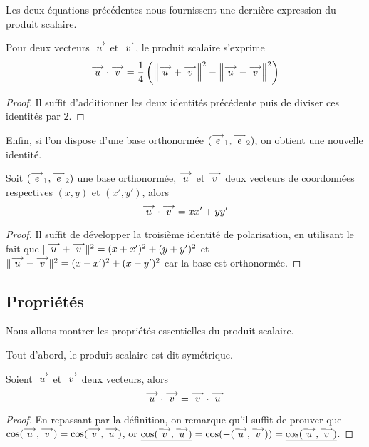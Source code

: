 Les deux équations précédentes nous fournissent une dernière expression du produit scalaire.

\begin{prop}
    Pour deux vecteurs $\overset{\longrightarrow}{u}$ et $\overset{\longrightarrow}{v}$, le produit scalaire s'exprime $$\overset{\longrightarrow}{u} \cdot \overset{\longrightarrow}{v} = \frac{1}{4}\left(\left\|\overset{\longrightarrow}{u} + \overset{\longrightarrow}{v}\right\|^2 - \left\|\overset{\longrightarrow}{u} - \overset{\longrightarrow}{v}\right\|^2 \right)
    $$
\end{prop}

\begin{proof}
    Il suffit d'additionner les deux identités précédente puis de diviser ces identités par $2$.
\end{proof}

Enfin, si l'on dispose d'une base orthonormée $(\overset{\longrightarrow}{e}_1,\overset{\longrightarrow}{e}_2)$, on obtient une nouvelle identité.

\begin{prop}
    Soit $(\overset{\longrightarrow}{e}_1,\overset{\longrightarrow}{e}_2)$ une base orthonormée, $\overset{\longrightarrow}{u}$ et $\overset{\longrightarrow}{v}$ deux vecteurs de coordonnées respectives $(x,y)$ et $(x',y')$, alors $$\overset{\longrightarrow}{u}\cdot \overset{\longrightarrow}{v}=xx'+yy'$$
\end{prop}
\begin{proof}
    Il suffit de développer la troisième identité de polarisation, en utilisant le fait que $\|\overset{\longrightarrow}{u}+\overset{\longrightarrow}{v}\|^2=(x+x')^2+(y+y')^2$ et $\|\overset{\longrightarrow}{u}-\overset{\longrightarrow}{v}\|^2=(x-x')^2+(x-y')^2$ car la base est orthonormée.
\end{proof}

\subsection{Propriétés}

Nous allons montrer les propriétés essentielles du produit scalaire.

Tout d'abord, le produit scalaire est dit symétrique.

\begin{prop}[Symétrie]
    Soient $\overset{\longrightarrow}{u}$ et $\overset{\longrightarrow}{v}$ deux vecteurs, alors $$\overset{\longrightarrow}{u}\cdot\overset{\longrightarrow}{v} = \overset{\longrightarrow}{v} \cdot \overset{\longrightarrow}{u}$$
\end{prop}
\begin{proof}
    En repassant par la définition, on remarque qu'il suffit de prouver que $\cos(\overset{\longrightarrow}{u},\overset{\longrightarrow}{v})=\cos(\overset{\longrightarrow}{v},\overset{\longrightarrow}{u})$, or $\underline{\cos(\overset{\longrightarrow}{v},\overset{\longrightarrow}{u})}=\cos(-(\overset{\longrightarrow}{u},\overset{\longrightarrow}{v}))=\underline{\cos(\overset{\longrightarrow}{u},\overset{\longrightarrow}{v})}$.
\end{proof}

